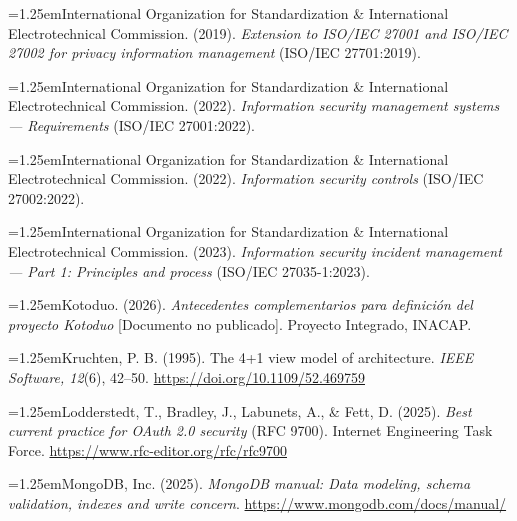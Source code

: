 \documentclass[11pt,a4paper]{article}
\newenvironment{hangparas}{\par\hangindent=1.25em\hangafter=1\noindent}{\par}
\begin{document}
\begin{hangparas}International Organization for Standardization \& International Electrotechnical Commission. (2019). \textit{Extension to ISO/IEC 27001 and ISO/IEC 27002 for privacy information management} (ISO/IEC 27701:2019).\end{hangparas}

\begin{hangparas}International Organization for Standardization \& International Electrotechnical Commission. (2022). \textit{Information security management systems --- Requirements} (ISO/IEC 27001:2022).\end{hangparas}

\begin{hangparas}International Organization for Standardization \& International Electrotechnical Commission. (2022). \textit{Information security controls} (ISO/IEC 27002:2022).\end{hangparas}

\begin{hangparas}International Organization for Standardization \& International Electrotechnical Commission. (2023). \textit{Information security incident management --- Part 1: Principles and process} (ISO/IEC 27035-1:2023).\end{hangparas}

\begin{hangparas}Kotoduo. (2026). \textit{Antecedentes complementarios para definición del proyecto Kotoduo} [Documento no publicado]. Proyecto Integrado, INACAP.\end{hangparas}

\begin{hangparas}Kruchten, P. B. (1995). The 4+1 view model of architecture. \textit{IEEE Software, 12}(6), 42--50. \url{https://doi.org/10.1109/52.469759}\end{hangparas}

\begin{hangparas}Lodderstedt, T., Bradley, J., Labunets, A., \& Fett, D. (2025). \textit{Best current practice for OAuth 2.0 security} (RFC 9700). Internet Engineering Task Force. \url{https://www.rfc-editor.org/rfc/rfc9700}\end{hangparas}

\begin{hangparas}MongoDB, Inc. (2025). \textit{MongoDB manual: Data modeling, schema validation, indexes and write concern}. \url{https://www.mongodb.com/docs/manual/}\end{hangparas}
\end{document}
